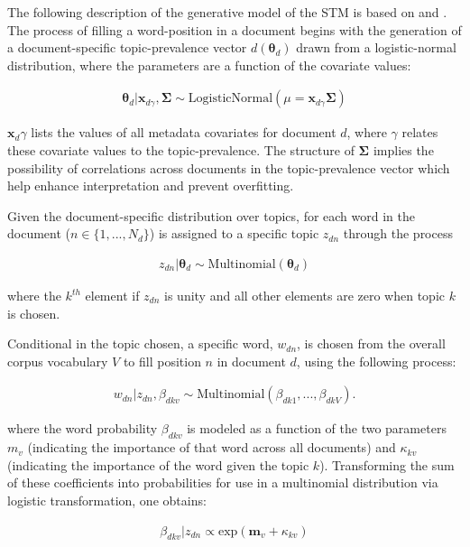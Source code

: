 \documentclass[12pt,a4paper,notitlepage]{article}
\begin{document}
The following description of the generative model of the STM is based on \citet{roberts_structural_2013} and \citet{roberts_stm:_2016}. The process of filling a word-position in a document begins with the generation of a document-specific topic-prevalence vector $d(\boldsymbol{\theta}_d)$ drawn from a logistic-normal distribution, where the parameters are a function of the covariate values:

\begin{align*}
	\boldsymbol{\theta}_d|\boldsymbol{x}_{d\gamma},\boldsymbol{\Sigma} \sim \textrm{LogisticNormal}(\mu = \boldsymbol{x}_{d\gamma}\boldsymbol{\Sigma})
\end{align*}

$\boldsymbol{x}_d\gamma$ lists the values of all metadata covariates for document $d$, where $\gamma$ relates these covariate values to the topic-prevalence. The structure of $\boldsymbol{\Sigma}$ implies the possibility of correlations across documents in the topic-prevalence vector which help enhance interpretation and prevent overfitting. 

Given the document-specific distribution over topics, for each word in the document ($n \in \lbrace 1,...,N_d\rbrace$) is assigned to a specific topic $z_{dn}$ through the process

\begin{align*}
	z_{dn}|\boldsymbol{\theta}_d \sim \textrm{Multinomial}(\boldsymbol{\theta}_d)
\end{align*}

where the $k^{th}$ element if $z_{dn}$ is unity and all other elements are zero when topic $k$ is chosen. 

Conditional in the topic chosen, a specific word, $w_{dn}$, is chosen from the overall corpus vocabulary $V$ to fill position $n$ in document $d$, using the following process:

\begin{align*}
	w_{dn}|z_{dn},\beta_{dkv} \sim \textrm{Multinomial}(\beta_{dk1},...,\beta_{dkV}).
\end{align*}

where the word probability $\beta_{dkv}$ is modeled as a function of the two parameters $m_v$ (indicating the importance of that word across all documents) and $\kappa_{kv}$ (indicating the importance of the word given the topic $k$). Transforming the sum of these coefficients into probabilities for use in a multinomial distribution via logistic transformation, one obtains:

\begin{align*}
	\beta_{dkv}|z_{dn}\propto\textrm{exp}(\boldsymbol{m}_v+\kappa_{kv})
\end{align*}
\end{document}
